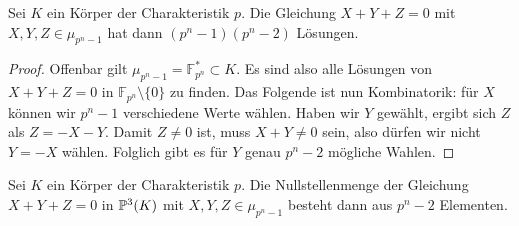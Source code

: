 \begin{lemma}
Sei $K$ ein Körper der Charakteristik $p$. Die Gleichung $X+Y+Z=0$ mit $X,Y,Z \in \mu_{p^n-1}$ hat dann $(p^n-1)(p^n-2)$ Lösungen.
\end{lemma}
\begin{proof}
Offenbar gilt $\mu_{p^n-1} = \mathbb F_{p^n}^* \subset K$. Es sind also alle Lösungen von $X+Y+Z=0$ in $\mathbb F_{p^n} \setminus \{0\}$ zu finden. Das Folgende ist nun Kombinatorik: für $X$ können wir $p^n-1$ verschiedene Werte wählen. Haben wir $Y$ gewählt, ergibt sich $Z$ als $Z=-X-Y$. Damit $Z \neq 0$ ist, muss $X+Y \neq 0$ sein, also dürfen wir nicht $Y = -X$ wählen. Folglich gibt es für $Y$ genau $p^n-2$ mögliche Wahlen.
\end{proof}
\begin{coroll} \label{cor:projrootsum}
Sei $K$ ein Körper der Charakteristik $p$. Die Nullstellenmenge der Gleichung $X+Y+Z=0$ in $\mathbb P^{3}(K)$ mit $X,Y,Z \in \mu_{p^n-1}$ besteht dann aus $p^n-2$ Elementen.
\end{coroll}

